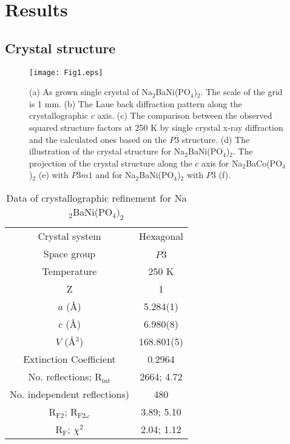 \documentclass[aps,twocolumn,superscriptaddress,showpacs]{revtex4-1}
\begin{document}
\section{Results}

\subsection{Crystal structure}

\begin{figure*}[tbp]
\texttt{[image: Fig1.eps]}
\caption{(a) As grown single crystal of Na$_2$BaNi(PO$_4$)$_2$. The scale of the grid is 1 mm. (b) The Laue back diffraction pattern along the crystallographic $c$ axis. (c) The comparison between the observed squared structure factors at 250 K by single crystal x-ray diffraction and the calculated ones based on the $P\overline{3}$ structure. (d) The illustration of the crystal structure for Na$_2$BaNi(PO$_4$)$_2$. The projection of the crystal structure along the $c$ axis for Na$_2$BaCo(PO$_4$)$_2$ (e) with $P\overline{3}m1$ and for Na$_2$BaNi(PO$_4$)$_2$ with $P\overline{3}$ (f).}
\end{figure*}

\begin{table}[h]
	\caption{Data of crystallographic refinement for Na$_{2}$BaNi(PO$_4)_2$} %
	\centering %
	\begin{tabular}{c c} %
		\hline\hline %
	    Crystal system & Hexagonal\\ %
		Space group & $P\overline{3}$ \\
		Temperature & 250 K \\
	    Z & 1 \\
		$a$ (\AA) & 5.284(1) \\
		$c$ (\AA) & 6.980(8) \\
		$V$ (\AA$^3$) & 168.801(5) \\
		Extinction Coefficient & 0.2964 \\
		No. reflections; R$_\text{int}$ & 2664; 4.72 \\
		No. independent reflections) & 480 \\
	   R$_\text{F2}$; R$_{\text{F2}\omega}$ & 3.89; 5.10 \\
		R$_\text{F}$; $\chi^2$ & 2.04; 1.12\\

		\hline %
	\end{tabular}
	\label{table:nuclear} %
\end{table}
\end{document}
